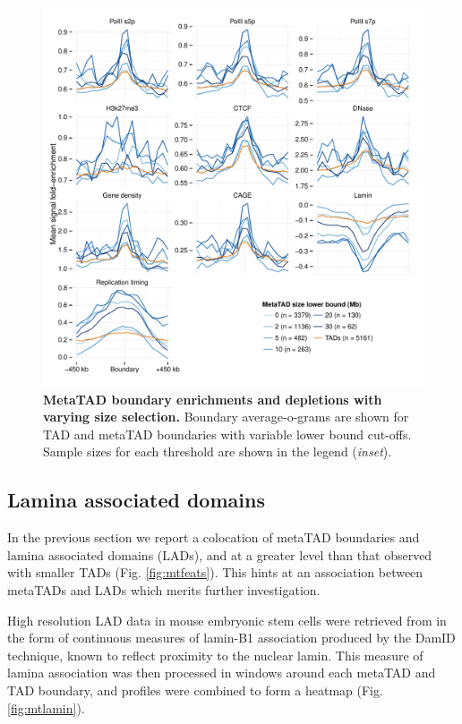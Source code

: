\documentclass[a4paper,11pt,oneside]{book}
\begin{document}
\begin{figure}
\begin{center} 
\includegraphics[width=4.5in]{metatad_cutoffenrich.pdf}
\captionsetup{width=\textwidth}
\caption[MetaTAD boundary enrichments and depletions with varying size selection.]{ {\bf MetaTAD boundary enrichments and depletions with varying size selection. }
Boundary average-o-grams are shown for TAD and metaTAD boundaries with variable lower bound cut-offs. Sample sizes for each threshold are shown in the legend (\emph{inset}).
}\label{fig:mtcutoffenrich}
\end{center}
\end{figure} 

\subsection{Lamina associated domains}\label{sec:mtlads}

In the previous section we report a colocation of metaTAD boundaries and lamina associated domains (LADs), and at a greater level than that observed with smaller TADs (Fig. \ref{fig:mtfeats}). This hints at an association between metaTADs and LADs which merits further investigation.

High resolution LAD data in mouse embryonic stem cells were retrieved from \citet{Peric-Hupkes2010} in the form of continuous measures of lamin-B1 association produced by the DamID technique, known to reflect proximity to the nuclear lamin.\cite{Pickersgill2006} This measure of lamina association was then processed in windows around each metaTAD and TAD boundary, and profiles were combined to form a heatmap (Fig. \ref{fig:mtlamin}).
\end{document}
